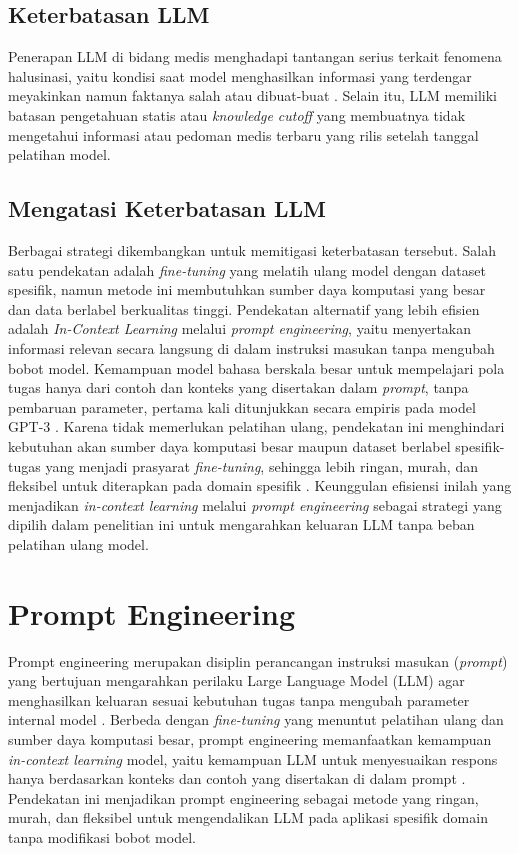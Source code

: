 \subsection{Keterbatasan LLM}
Penerapan LLM di bidang medis menghadapi tantangan serius terkait fenomena halusinasi, yaitu kondisi saat model menghasilkan informasi yang terdengar meyakinkan namun faktanya salah atau dibuat-buat \autocite{Ji2023Survey}. Selain itu, LLM memiliki batasan pengetahuan statis atau \emph{knowledge cutoff} yang membuatnya tidak mengetahui informasi atau pedoman medis terbaru yang rilis setelah tanggal pelatihan model.

\subsection{Mengatasi Keterbatasan LLM}
Berbagai strategi dikembangkan untuk memitigasi keterbatasan tersebut. Salah satu pendekatan adalah \emph{fine-tuning} yang melatih ulang model dengan dataset spesifik, namun metode ini membutuhkan sumber daya komputasi yang besar dan data berlabel berkualitas tinggi. Pendekatan alternatif yang lebih efisien adalah \emph{In-Context Learning} melalui \emph{prompt engineering}, yaitu menyertakan informasi relevan secara langsung di dalam instruksi masukan tanpa mengubah bobot model. Kemampuan model bahasa berskala besar untuk mempelajari pola tugas hanya dari contoh dan konteks yang disertakan dalam \emph{prompt}, tanpa pembaruan parameter, pertama kali ditunjukkan secara empiris pada model GPT-3 \autocite{Brown2020Language}. Karena tidak memerlukan pelatihan ulang, pendekatan ini menghindari kebutuhan akan sumber daya komputasi besar maupun dataset berlabel spesifik-tugas yang menjadi prasyarat \emph{fine-tuning}, sehingga lebih ringan, murah, dan fleksibel untuk diterapkan pada domain spesifik \autocite{Liu2023Prompt}. Keunggulan efisiensi inilah yang menjadikan \emph{in-context learning} melalui \emph{prompt engineering} sebagai strategi yang dipilih dalam penelitian ini untuk mengarahkan keluaran LLM tanpa beban pelatihan ulang model.

\section{Prompt Engineering}
Prompt engineering merupakan disiplin perancangan instruksi masukan (\emph{prompt}) yang bertujuan mengarahkan perilaku Large Language Model (LLM) agar menghasilkan keluaran sesuai kebutuhan tugas tanpa mengubah parameter internal model \autocite{Brown2020Language}. Berbeda dengan \emph{fine-tuning} yang menuntut pelatihan ulang dan sumber daya komputasi besar, prompt engineering memanfaatkan kemampuan \emph{in-context learning} model, yaitu kemampuan LLM untuk menyesuaikan respons hanya berdasarkan konteks dan contoh yang disertakan di dalam prompt \autocite{Brown2020Language}. Pendekatan ini menjadikan prompt engineering sebagai metode yang ringan, murah, dan fleksibel untuk mengendalikan LLM pada aplikasi spesifik domain tanpa modifikasi bobot model.

